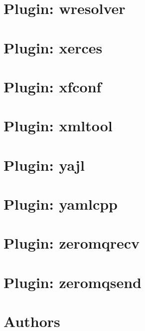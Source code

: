 \let\mypdfximage\pdfximage\def\pdfximage{\immediate\mypdfximage}\documentclass[twoside]{book}
\newcommand{\+}{\discretionary{\mbox{\scriptsize$\hookleftarrow$}}{}{}}
\begin{document}
\chapter{Plugin\+: wresolver}
\label{md_src_plugins_wresolver_README}

\chapter{Plugin\+: xerces}
\label{md_src_plugins_xerces_README}

\chapter{Plugin\+: xfconf}
\label{md_src_plugins_xfconf_README}

\chapter{Plugin\+: xmltool}
\label{md_src_plugins_xmltool_README}

\chapter{Plugin\+: yajl}
\label{md_src_plugins_yajl_README}

\chapter{Plugin\+: yamlcpp}
\label{md_src_plugins_yamlcpp_README}

\chapter{Plugin\+: zeromqrecv}
\label{md_src_plugins_zeromqrecv_README}

\chapter{Plugin\+: zeromqsend}
\label{md_src_plugins_zeromqsend_README}

\chapter{Authors}
\label{doc_AUTHORS_md}

\end{document}
